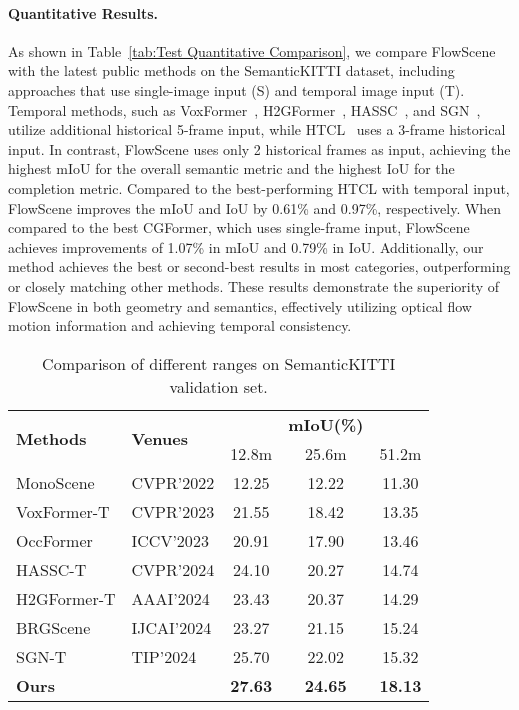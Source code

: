 \paragraph{Quantitative Results.}
As shown in Table~\ref{tab:Test Quantitative Comparison}, we compare FlowScene with the latest public methods on the SemanticKITTI dataset, including approaches that use single-image input (S) and temporal image input (T). Temporal methods, such as VoxFormer~\cite{li2023voxformer}, H2GFormer~\cite{wang2024h2gformer}, HASSC~\cite{wang2024HASSC}, and SGN~\cite{mei2024sgn}, utilize additional historical 5-frame input, while HTCL~\cite{li2024htcl} uses a 3-frame historical input. In contrast, FlowScene uses only 2 historical frames as input, achieving the highest mIoU for the overall semantic metric and the highest IoU for the completion metric.
Compared to the best-performing HTCL with temporal input, FlowScene improves the mIoU and IoU by 0.61\% and 0.97\%, respectively. When compared to the best CGFormer, which uses single-frame input, FlowScene achieves improvements of 1.07\% in mIoU and 0.79\% in IoU. Additionally, our method achieves the best or second-best results in most categories, outperforming or closely matching other methods. These results demonstrate the superiority of FlowScene in both geometry and semantics, effectively utilizing optical flow motion information and achieving temporal consistency.
\begin{table}[t]
  \centering
  \small
  \begin{tabular}{l|l|ccc}
    \toprule
    \multirow{2}{*}{\textbf{Methods}}  & \multirow{2}{*}{\textbf{Venues}}& & \textbf{mIoU(\%)} &  \\
    & &12.8m &25.6m & 51.2m  \\
    \midrule
    MonoScene  & CVPR'2022&12.25& 12.22& 11.30\\
    VoxFormer-T& CVPR'2023 & 21.55& 18.42 &13.35\\
    OccFormer& ICCV'2023 & 20.91& 17.90& 13.46\\
    HASSC-T& CVPR'2024& 24.10 &20.27 &14.74\\
    H2GFormer-T& AAAI'2024 & 23.43& 20.37& 14.29 \\
    BRGScene& IJCAI'2024 & 23.27& 21.15& 15.24\\
    SGN-T&TIP'2024&25.70 &22.02& 15.32\\
    \rowcolor{gray!20}\textbf{Ours} & &  \textbf{27.63}& \textbf{24.65}& \textbf{18.13}\\
    \bottomrule
  \end{tabular} 
\caption{Comparison of different ranges on SemanticKITTI validation set.}
  \label{tab:diff range}
  \vspace{-5mm}
\end{table}
